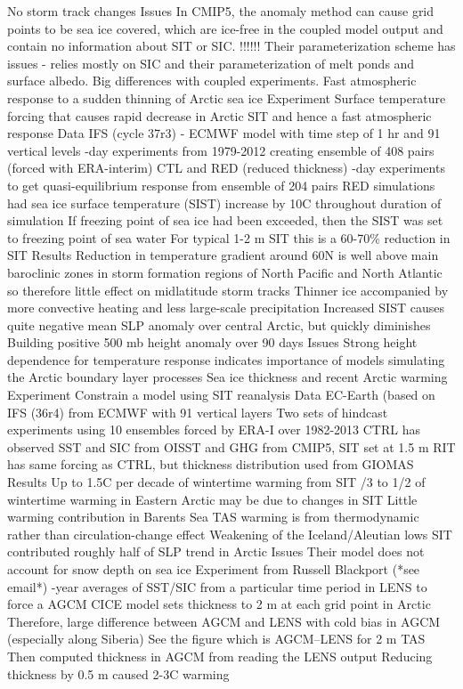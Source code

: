 \documentclass[12pt,fleqn]{article}
\begin{document}
\begin{outline}[enumerate]
		\3 No storm track changes
	\2 Issues
		\3 In CMIP5, the anomaly method can cause grid points to be sea ice covered, which are ice-free in the coupled model output and contain no information about SIT or SIC.
		\3 !!!!!! Their parameterization scheme has issues - relies mostly on SIC and their parameterization of melt ponds and surface albedo. Big differences with coupled experiments.
\1 Fast atmospheric response to a sudden thinning of Arctic sea ice \citep{Semmler2016}
	\2 Experiment
		\3 Surface temperature forcing that causes rapid decrease in Arctic SIT and hence a fast atmospheric response
	\2 Data
		\3 IFS (cycle 37r3) - ECMWF model with time step of 1 hr and 91 vertical levels
		-day experiments from 1979-2012 creating ensemble of 408 pairs (forced with ERA-interim)
		\3 CTL and RED (reduced thickness)
		-day experiments to get quasi-equilibrium response from ensemble of 204 pairs
		\3 RED simulations had sea ice surface temperature (SIST) increase by 10\degree C throughout duration of simulation
			\4 If freezing point of sea ice had been exceeded, then the SIST was set to freezing point of sea water
		\3 For typical 1-2 m SIT this is a 60-70\% reduction in SIT
	\2 Results
		\3 Reduction in temperature gradient around 60\degree N is well above main baroclinic zones in storm formation regions of North Pacific and North Atlantic so therefore little effect on midlatitude storm tracks
		\3 Thinner ice accompanied by more convective heating and less large-scale precipitation
		\3 Increased SIST causes quite negative mean SLP anomaly over central Arctic, but quickly diminishes
		\3 Building positive 500 mb height anomaly over 90 days
	\2 Issues
		\3 Strong height dependence for temperature response indicates importance of models simulating the Arctic boundary layer processes
\1 Sea ice thickness and recent Arctic warming \citep{Lang2016}
	\2 Experiment
		\3 Constrain a model using SIT reanalysis 
	\2 Data
		\3 EC-Earth (based on IFS (36r4) from ECMWF with 91 vertical layers
		\3 Two sets of hindcast experiments using 10 ensembles forced by ERA-I over 1982-2013
		\3 CTRL has observed SST and SIC from OISST and GHG from CMIP5, SIT set at 1.5 m
		\3 RIT has same forcing as CTRL, but thickness distribution used from GIOMAS
	\2 Results
		\3 Up to 1.5\degree C per decade of wintertime warming from SIT
		/3 to 1/2 of wintertime warming in Eastern Arctic may be due to changes in SIT
		\3 Little warming contribution in Barents Sea
		\3 TAS warming is from thermodynamic rather than circulation-change effect
		\3 Weakening of the Iceland/Aleutian lows 
		\3 SIT contributed roughly half of SLP trend in Arctic 
	\2 Issues
		\3 Their model does not account for snow depth on sea ice
\1 Experiment from Russell Blackport (*see email*)
	-year averages of SST/SIC from a particular time period in LENS to force a AGCM
	\2 CICE model sets thickness to 2 m at each grid point in Arctic
	\2 Therefore, large difference between AGCM and LENS with cold bias in AGCM (especially along Siberia)
		\3 See the figure which is AGCM--LENS for 2 m TAS
	\2 Then computed thickness in AGCM from reading the LENS output
	\2 Reducing thickness by 0.5 m caused 2-3\degree C warming
\end{outline}
\end{document}

